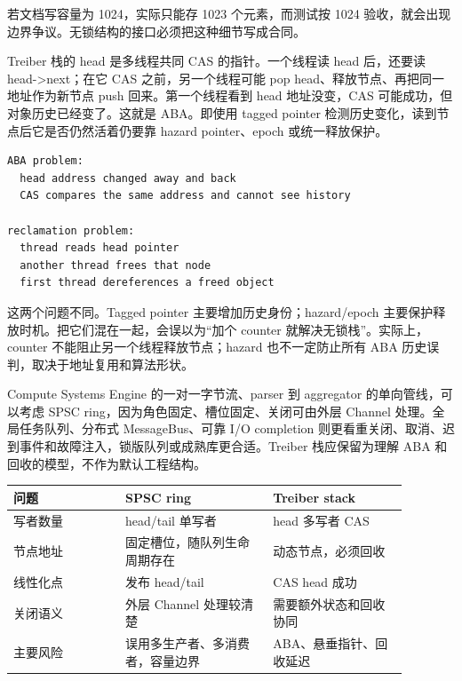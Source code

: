 若文档写容量为 1024，实际只能存 1023 个元素，而测试按 1024 验收，就会出现边界争议。无锁结构的接口必须把这种细节写成合同。

Treiber 栈的 head 是多线程共同 CAS 的指针。一个线程读 head 后，还要读 head->next；在它 CAS 之前，另一个线程可能 pop head、释放节点、再把同一地址作为新节点 push 回来。第一个线程看到 head 地址没变，CAS 可能成功，但对象历史已经变了。这就是 ABA。即使用 tagged pointer 检测历史变化，读到节点后它是否仍然活着仍要靠 hazard pointer、epoch 或统一释放保护。

\begin{lstlisting}[numbers=none,caption={Treiber pop 的两个独立问题}]
ABA problem:
  head address changed away and back
  CAS compares the same address and cannot see history

reclamation problem:
  thread reads head pointer
  another thread frees that node
  first thread dereferences a freed object
\end{lstlisting}

这两个问题不同。Tagged pointer 主要增加历史身份；hazard/epoch 主要保护释放时机。把它们混在一起，会误以为“加个 counter 就解决无锁栈”。实际上，counter 不能阻止另一个线程释放节点；hazard 也不一定防止所有 ABA 历史误判，取决于地址复用和算法形状。

Compute Systems Engine 的一对一字节流、parser 到 aggregator 的单向管线，可以考虑 SPSC ring，因为角色固定、槽位固定、关闭可由外层 Channel 处理。全局任务队列、分布式 MessageBus、可靠 I/O completion 则更看重关闭、取消、迟到事件和故障注入，锁版队列或成熟库更合适。Treiber 栈应保留为理解 ABA 和回收的模型，不作为默认工程结构。

\begin{center}
\begin{tabular}{p{0.25\linewidth}p{0.33\linewidth}p{0.30\linewidth}}
\toprule
问题 & SPSC ring & Treiber stack \\
\midrule
写者数量 & head/tail 单写者 & head 多写者 CAS \\
节点地址 & 固定槽位，随队列生命周期存在 & 动态节点，必须回收 \\
线性化点 & 发布 head/tail & CAS head 成功 \\
关闭语义 & 外层 Channel 处理较清楚 & 需要额外状态和回收协同 \\
主要风险 & 误用多生产者、多消费者，容量边界 & ABA、悬垂指针、回收延迟 \\
\bottomrule
\end{tabular}
\end{center}

